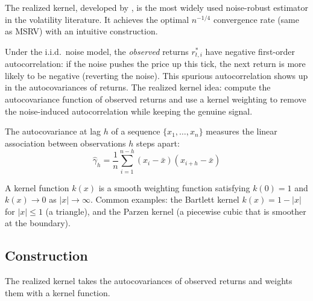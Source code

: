 The realized kernel, developed by \citet{BNHLS2008}, is the most widely used noise-robust estimator in the volatility literature.
It achieves the optimal $n^{-1/4}$ convergence rate (same as MSRV) with an intuitive construction.

\begin{intuition}
Under the i.i.d.\ noise model, the \emph{observed} returns $r^*_{t,i}$ have negative first-order autocorrelation: if the noise pushes the price up this tick, the next return is more likely to be negative (reverting the noise).
This spurious autocorrelation shows up in the autocovariances of returns.
The realized kernel idea: compute the autocovariance function of observed returns and use a kernel weighting to remove the noise-induced autocorrelation while keeping the genuine signal.
\end{intuition}

\begin{prereq}[Autocovariance]
The autocovariance at lag $h$ of a sequence $\{x_1, \ldots, x_n\}$ measures the linear association between observations $h$ steps apart:
\[
  \hat{\gamma}_h = \frac{1}{n} \sum_{i=1}^{n-h} (x_i - \bar{x})(x_{i+h} - \bar{x})
\]
\end{prereq}

\begin{prereq}
A kernel function $k(x)$ is a smooth weighting function satisfying $k(0) = 1$ and $k(x) \to 0$ as $|x| \to \infty$.
Common examples: the Bartlett kernel $k(x) = 1 - |x|$ for $|x| \leq 1$ (a triangle), and the Parzen kernel (a piecewise cubic that is smoother at the boundary).
\end{prereq}

\subsection{Construction}

The realized kernel takes the autocovariances of observed returns and weights them with a kernel function.

